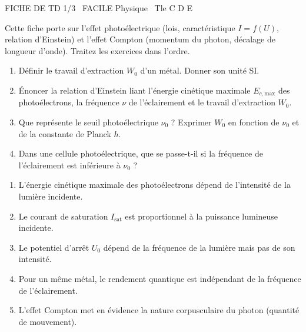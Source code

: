 \documentclass[11pt]{article}
\begin{document}
\begin{tcolorbox}[enhanced,colback=popink,colframe=popink,arc=10pt,boxrule=0pt,left=12pt,right=12pt,top=9pt,bottom=9pt]
{\color{white}\popxbold\small FICHE DE TD 1/3 \textbullet\ FACILE \hfill Physique \textbullet\ Tle C D E\par}
\end{tcolorbox}
\vspace{4pt}
\noindent Cette fiche porte sur l'effet photoélectrique (lois, caractéristique $I=f(U)$, relation d'Einstein) et l'effet Compton (momentum du photon, décalage de longueur d'onde). Traitez les exercices dans l'ordre.

\begin{exercice}
\begin{enumerate}
    \item Définir le travail d'extraction $W_0$ d'un métal. Donner son unité SI.
    \item Énoncer la relation d'Einstein liant l'énergie cinétique maximale $E_{c,\text{max}}$ des photoélectrons, la fréquence $\nu$ de l'éclairement et le travail d'extraction $W_0$.
    \item Que représente le seuil photoélectrique $\nu_0$ ? Exprimer $W_0$ en fonction de $\nu_0$ et de la constante de Planck $h$.
    \item Dans une cellule photoélectrique, que se passe-t-il si la fréquence de l'éclairement est inférieure à $\nu_0$ ?
\end{enumerate}
\end{exercice}

\begin{exercice}
\begin{enumerate}
    \item L'énergie cinétique maximale des photoélectrons dépend de l'intensité de la lumière incidente.
    \item Le courant de saturation $I_{\text{sat}}$ est proportionnel à la puissance lumineuse incidente.
    \item Le potentiel d'arrêt $U_0$ dépend de la fréquence de la lumière mais pas de son intensité.
    \item Pour un même métal, le rendement quantique est indépendant de la fréquence de l'éclairement.
    \item L'effet Compton met en évidence la nature corpusculaire du photon (quantité de mouvement).
\end{enumerate}
\end{exercice}
\end{document}
